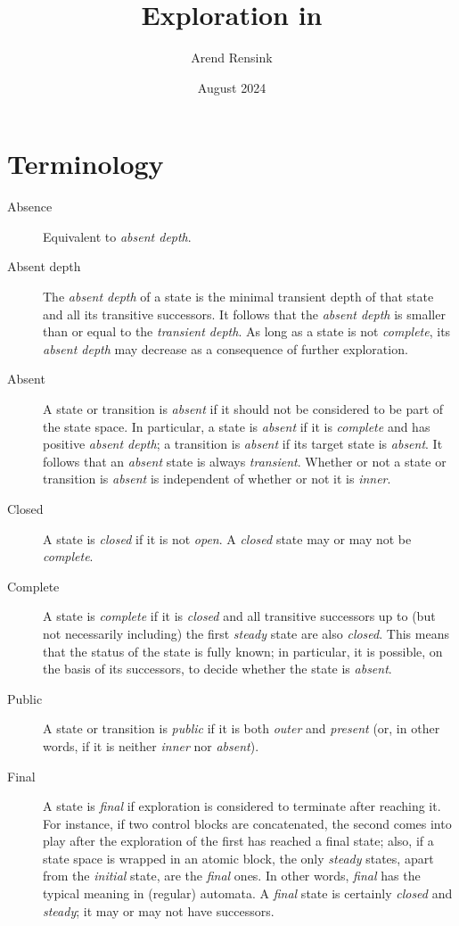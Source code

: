 \documentclass{article}
\begin{document}
\title{Exploration in \GROOVE}
\author{Arend Rensink}
\date{August 2024}
\maketitle

\section*{Terminology}

\begin{description}
\item[Absence] Equivalent to \emph{absent depth}.

\item[Absent depth] The \emph{absent depth} of a state is the minimal transient depth of that state and all its transitive successors. It follows that the \emph{absent depth} is smaller than or equal to the \emph{transient depth}. As long as a state is not \emph{complete}, its \emph{absent depth} may decrease as a consequence of further exploration.

\item[Absent] A state or transition is \emph{absent} if it should not be considered to be part of the state space. In particular, a state is \emph{absent} if it is \emph{complete} and has positive \emph{absent depth}; a transition is \emph{absent} if its target state is \emph{absent}. It follows that an \emph{absent} state is always \emph{transient}. Whether or not a state or transition is \emph{absent} is independent of whether or not it is \emph{inner}.

\item[Closed] A state is \emph{closed} if it is not \emph{open}. A \emph{closed} state may or may not be \emph{complete}.

\item[Complete] A state is \emph{complete} if it is \emph{closed} and all transitive successors up to (but not necessarily including) the first \emph{steady} state are also \emph{closed}. This means that the status of the state is fully known; in particular, it is possible, on the basis of its successors, to decide whether the state is \emph{absent}.

\item[Public] A state or transition is \emph{public} if it is both \emph{outer} and \emph{present} (or, in other words, if it is neither \emph{inner} nor \emph{absent}).

\item[Final] A state is \emph{final} if exploration is considered to terminate after reaching it. For instance, if two control blocks are concatenated, the second comes into play after the exploration of the first has reached a final state; also, if a state space is wrapped in an atomic block, the only \emph{steady} states, apart from the \emph{initial} state, are the \emph{final} ones. In other words, \emph{final} has the typical meaning in (regular) automata. A \emph{final} state is certainly \emph{closed} and \emph{steady}; it may or may not have successors.


\end{description}
\end{document}
